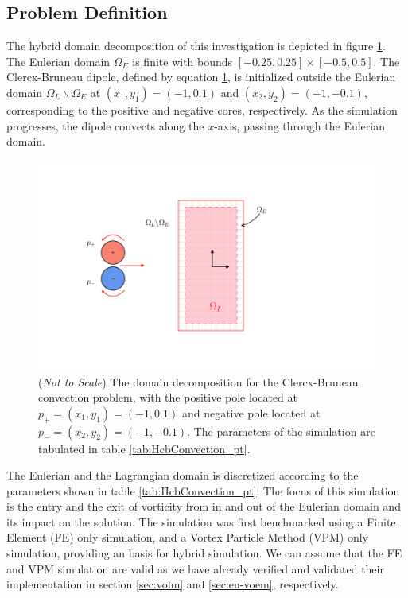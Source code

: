 \subsection{Problem Definition}

The hybrid domain decomposition of this investigation is depicted in figure \ref{fig:hcbconv_dd}. The Eulerian domain $\Omega_E$ is finite with bounds $[-0.25,0.25]\times[-0.5,0.5]$. The Clercx-Bruneau dipole, defined by equation \ref{fig:hcbconv_dd}, is initialized outside the Eulerian domain $\Omega_L\backslash\Omega_E$ at $(x_1,y_1) = (-1,0.1)$ and $(x_2,y_2)=(-1,-0.1)$, corresponding to the positive and negative cores, respectively. As the simulation progresses, the dipole convects along the $x$-axis, passing through the Eulerian domain.

	\begin{figure}[!h]
	\centering
	\includegraphics[trim=0cm 2.5cm 0cm 2.5cm, clip, width=\linewidth]{./figures/validation/cbConv/hcbconv_dd.pdf}
	\caption{(\textit{Not to Scale}) The domain decomposition for the Clercx-Bruneau convection problem, with the positive pole located at $p_{+}=(x_1,y_1) = (-1,0.1)$ and negative pole located at $p_{-}=(x_2,y_2)=(-1,-0.1)$. The parameters of the simulation are tabulated in table \ref{tab:HcbConvection_pt}.}
	\label{fig:hcbconv_dd}
	\end{figure}
	
The Eulerian and the Lagrangian domain is discretized according to the parameters shown in table \ref{tab:HcbConvection_pt}. The focus of this simulation is the entry and the exit of vorticity from in and out of the Eulerian domain and its impact on the solution. The simulation was first benchmarked using a Finite Element (FE) only simulation, and a Vortex Particle Method (VPM) only simulation, providing an basis for hybrid simulation. We can assume that the FE and VPM simulation are valid as we have already verified and validated their implementation in section \ref{sec:volm} and \ref{sec:eu-voem}, respectively.


